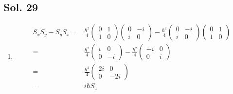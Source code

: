    \subsection*{Sol. 29}
\begin{enumerate}
    \item 
    \begin{align*}
        S_xS_y 
        -S_yS_x
    =&
    \frac{\hbar^2}{4}
    \begin{pmatrix}
    0 & 1 \\
    1 & 0
    \end{pmatrix}
    \begin{pmatrix}
    0 & -i \\
    i & 0
    \end{pmatrix}
    -
    \frac{\hbar^2}{4}
    \begin{pmatrix}
    0 & -i \\
    i & 0
    \end{pmatrix}
    \begin{pmatrix}
    0 & 1 \\
    1 & 0
    \end{pmatrix}\\
    =&
    \frac{\hbar^2}{4}
    \begin{pmatrix}
        i & 0\\
        0 & -i
    \end{pmatrix}
    -
    \frac{\hbar^2}{4}
    \begin{pmatrix}
        -i & 0\\
        0 & i
    \end{pmatrix}
    \\
    =&
    \frac{\hbar^2}{4}
    \begin{pmatrix}
        2i & 0\\
        0 & -2i
    \end{pmatrix}\\
    =&i\hbar S_z
    \end{align*}


\end{enumerate}
